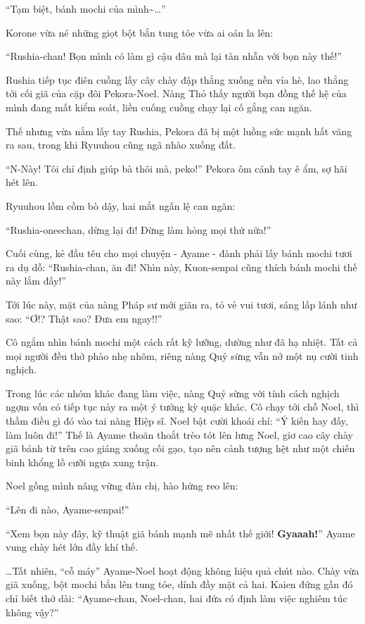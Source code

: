 \documentclass[../main.tex]{subfiles}
\begin{document}
``Tạm biệt, bánh mochi của mình\~{}\dots''

Korone vừa né những giọt bột bắn tung tóe vừa ai oán la lên:

``Rushia-chan! Bọn mình có làm gì cậu đâu mà lại tàn nhẫn với bọn này thế!''

Rushia tiếp tục điên cuồng lấy cây chày đập thẳng xuống nền vỉa hè, lao thẳng tới cối giã của cặp đôi Pekora-Noel. Nàng Thỏ thấy người bạn đồng thế hệ của mình đang mất kiểm soát, liền cuống cuồng chạy lại cố gắng can ngăn.

Thế nhưng vừa nắm lấy tay Rushia, Pekora đã bị một luồng sức mạnh hất văng ra sau, trong khi Ryuuhou cũng ngã nhào xuống đất.

``N-Này! Tôi chỉ định giúp bà thôi mà, peko!'' Pekora ôm cánh tay ê ẩm, sợ hãi hét lên.

Ryuuhou lồm cồm bò dậy, hai mắt ngấn lệ can ngăn:

``Rushia-oneechan, dừng lại đi! Đừng làm hỏng mọi thứ nữa!''

Cuối cùng, kẻ đầu têu cho mọi chuyện - Ayame - đành phải lấy bánh mochi tươi ra dụ dỗ: ``Rushia-chan, ăn đi! Nhìn này, Kuon-senpai cũng thích bánh mochi thế này lắm đấy!''

Tới lúc này, mặt của nàng Pháp sư mới giãn ra, tỏ vẻ vui tươi, sáng lấp lánh như sao: ``Ơ!? Thật sao? Đưa em ngay!!''

Cô ngắm nhìn bánh mochi một cách rất kỹ lưỡng, dường như đã hạ nhiệt. Tất cả mọi người đều thở phào nhẹ nhõm, riêng nàng Quỷ sừng vẫn nở một nụ cười tinh nghịch.

\ct

Trong lúc các nhóm khác đang làm việc, nàng Quỷ sừng với tính cách nghịch ngợm vốn có tiếp tục nảy ra một ý tưởng kỳ quặc khác. Cô chạy tới chỗ Noel, thì thầm điều gì đó vào tai nàng Hiệp sĩ. Noel bật cười khoái chí: ``Ý kiến hay đấy, làm luôn đi!'' Thế là Ayame thoăn thoắt trèo tót lên lưng Noel, giơ cao cây chày giã bánh từ trên cao giáng xuống cối gạo, tạo nên cảnh tượng hệt như một chiến binh khổng lồ cưỡi ngựa xung trận.

Noel gồng mình nâng vững đàn chị, hào hứng reo lên:

``Lên đi nào, Ayame-senpai!''

``Xem bọn này đây, kỹ thuật giã bánh mạnh mẽ nhất thế giới! \textbf{Gyaaah!}'' Ayame vung chày hét lớn đầy khí thế.

\dots Tất nhiên, ``cỗ máy'' Ayame-Noel hoạt động không hiệu quả chút nào. Chày vừa giã xuống, bột mochi bắn lên tung tóe, dính đầy mặt cả hai. Kaien đứng gần đó chỉ biết thở dài: ``Ayame-chan, Noel-chan, hai đứa có định làm việc nghiêm túc không vậy?''
\end{document}
